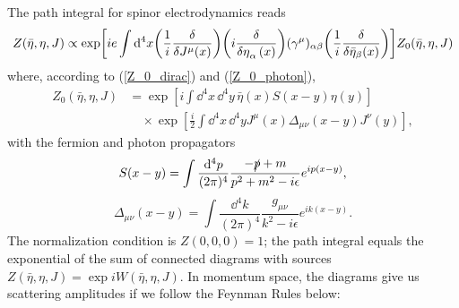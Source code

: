 The path integral for spinor electrodynamics reads
\begin{equation}
    Z(\bar{\eta},\eta,J)\propto \exp[ie\int\dd^4 x \qty(\frac{1}{i}\fdv{J^\mu(x)})\qty(i\fdv{{\eta}_\alpha(x)})(\gamma^\mu)_{\alpha\beta}\qty(\frac{1}{i}\fdv{\bar{\eta}_\beta(x)})]Z_0(\bar{\eta},\eta,J)
\end{equation}
where, according to (\ref{Z_0_dirac}) and (\ref{Z_0_photon}), 
\begin{equation}
\begin{aligned}
    Z_0(\bar{\eta},\eta,J)&=\exp[i\int\dd^4x\,\dd^4 y\, \bar{\eta}(x)S(x-y)\eta(y)]\\&\quad\times\exp[\frac{i}{2}\int\dd^4x\,\dd^4y J^\mu(x)\Delta_{\mu\nu}(x-y)J^\nu(y)],
\end{aligned}
\end{equation}
with the fermion and photon propagators
\begin{equation}
    S(x-y)=\int\frac{\dd^4 p}{(2\pi)^4}\frac{-\slashed{p}+m}{p^2+m^2-i\epsilon}e^{ip(x-y)},
\end{equation}
\begin{equation}
    \Delta_{\mu\nu}(x-y)=\int\frac{\dd^4 k}{(2\pi)^4}\frac{g_{\mu\nu}}{k^2-i\epsilon}e^{ik(x-y)}.
\end{equation}
The normalization condition is $Z(0,0,0)=1$; the path integral equals the exponential of the sum of connected diagrams with sources $Z(\bar{\eta},\eta,J)=\exp iW(\bar{\eta},\eta,J)$. In momentum space, the diagrams give us scattering amplitudes if we follow the Feynman Rules below:
